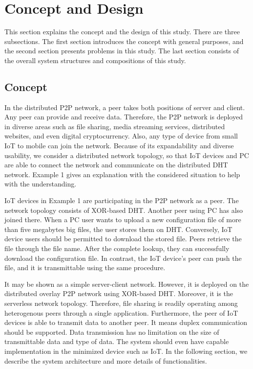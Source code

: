 \chapter{Concept and Design}
\label{cha:conceptanddesign}

This section explains the concept and the design of this study. There are three subsections. The first section introduces the concept with general purposes, and the second section presents problems in this study. The last section consists of the overall system structures and compositions of this study.

\section{Concept}

In the distributed P2P network, a peer takes both positions of server and client. Any peer can provide and receive data. Therefore, the P2P network is deployed in diverse areas such as file sharing, media streaming services, distributed websites, and even digital cryptocurrency. Also, any type of device from small IoT to mobile can join the network. Because of its expandability and diverse usability, we consider a distributed network topology, so that IoT devices and PC are able to connect the network and communicate on the distributed DHT network. Example 1 gives an explanation with the considered situation to help with the understanding.

IoT devices in Example 1 are participating in the P2P network as a peer. The network topology consists of XOR-based DHT. Another peer using PC has also joined there. When a PC user wants to upload a new configuration file of more than five megabytes big files, the user stores them on DHT. Conversely, IoT device users should be permitted to download the stored file. Peers retrieve the file through the file name. After the complete lookup, they can successfully download the configuration file. In contrast, the IoT device's peer can push the file, and it is transmittable using the same procedure.

It may be shown as a simple server-client network. However, it is deployed on the distributed overlay P2P network using XOR-based DHT. Moreover, it is the serverless network topology. Therefore, file sharing is readily operating among heterogenous peers through a single application. Furthermore, the peer of IoT devices is able to transmit data to another peer. It means duplex communication should be supported. Data transmission has no limitation on the size of transmittable data and type of data. The system should even have capable implementation in the minimized device such as IoT. In the following section, we describe the system architecture and more details of functionalities.

